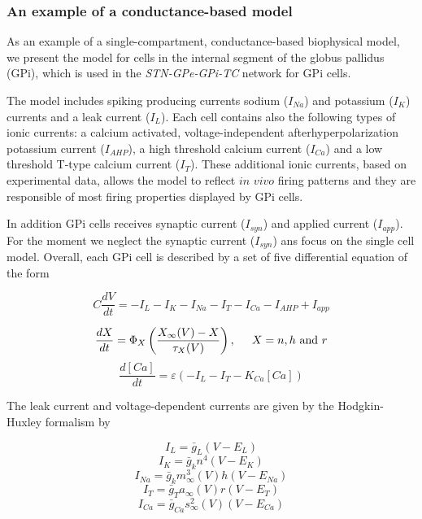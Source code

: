 \subsubsection{An example of a conductance-based model}
As an example of a single-compartment, conductance-based biophysical model, we present the model for cells in the internal segment of the globus pallidus (GPi), \cite{Rubin2004,Terman2002} which is used  in the \textit{STN-GPe-GPi-TC} network for GPi cells.

The model includes spiking producing currents sodium ($I_{Na}$) and potassium ($I_{K}$) currents and a leak current ($I_{L}$). Each cell contains also the following types of ionic currents: a calcium activated, voltage-independent afterhyperpolarization potassium current ($I_{AHP}$), a high threshold calcium current ($I_{Ca}$) and a low threshold T-type calcium current ($I_{T}$). These additional ionic currents, based on experimental data, allows the model to reflect $\textit{in vivo}$ firing patterns and they are responsible of most firing properties displayed by GPi cells.

In addition GPi cells receives synaptic current ($I_{syn}$) and applied current ($I_{app}$). For the moment we neglect the synaptic current ($I_{syn}$) ans focus on the single cell model. Overall, each GPi cell is described by a set of five differential equation of the form

\begin{equation}
    C\frac{dV}{dt} = -I_{L} - I_{K} - I_{Na} - I_{T} - I_{Ca} - I_{AHP} + I_{app}
\end{equation}

\begin{equation}
    \frac{dX}{dt} = \Phi_{X} \left( \frac{X_{\infty}(V)-X}{\tau_{X}(V)} \right), \hspace{0.5cm} X=n,h \text{ and } r
\end{equation}
\begin{equation}
    \frac{d[Ca]}{dt} = \varepsilon(-I_{L}-I_{T}-K_{Ca}[Ca])
    \label{ref1}
\end{equation}

The leak current and voltage-dependent currents are given by the Hodgkin-Huxley formalism by

\begin{equation}
    I_{L} = \bar{g}_{L}(V-E_{L})
\end{equation}
\begin{equation}
    I_{K} = \bar{g}_{k}n^{4}(V-E_{K})
\end{equation}
\begin{equation}
    I_{Na} = \bar{g}_{k}m_{\infty}^{3}(V)h(V-E_{Na})
\end{equation}
\begin{equation}
    I_{T} = \bar{g}_{T}a_{\infty}(V)r(V-E_{T})
\end{equation}
\begin{equation}
    I_{Ca} = \bar{g}_{Ca}s_{\infty}^{2}(V)(V-E_{Ca})
\end{equation}

